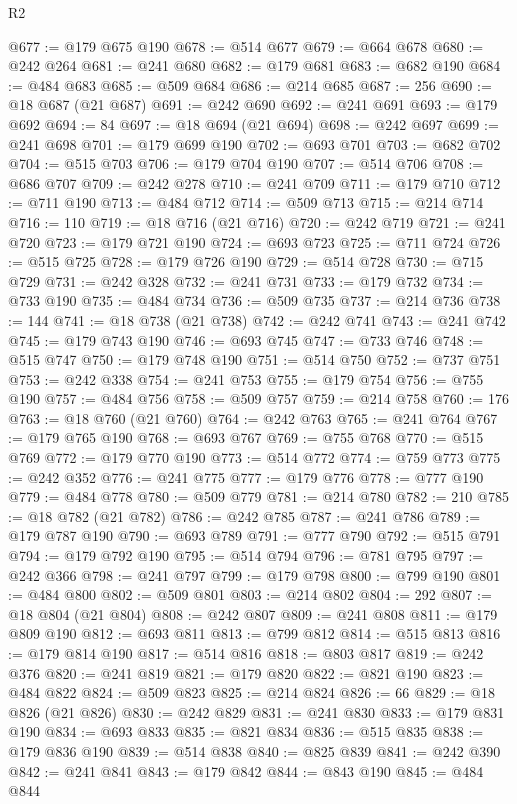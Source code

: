 \begin{lexlean}{R2}
\begin{coremodule}
@677 := @179 @675 @190
@678 := @514 @677
@679 := @664 @678
@680 := @242 @264
@681 := @241 @680
@682 := @179 @681
@683 := @682 @190
@684 := @484 @683
@685 := @509 @684
@686 := @214 @685
@687 := 256
@690 := @18 @687 (@21 @687)
@691 := @242 @690
@692 := @241 @691
@693 := @179 @692
@694 := 84
@697 := @18 @694 (@21 @694)
@698 := @242 @697
@699 := @241 @698
@701 := @179 @699 @190
@702 := @693 @701
@703 := @682 @702
@704 := @515 @703
@706 := @179 @704 @190
@707 := @514 @706
@708 := @686 @707
@709 := @242 @278
@710 := @241 @709
@711 := @179 @710
@712 := @711 @190
@713 := @484 @712
@714 := @509 @713
@715 := @214 @714
@716 := 110
@719 := @18 @716 (@21 @716)
@720 := @242 @719
@721 := @241 @720
@723 := @179 @721 @190
@724 := @693 @723
@725 := @711 @724
@726 := @515 @725
@728 := @179 @726 @190
@729 := @514 @728
@730 := @715 @729
@731 := @242 @328
@732 := @241 @731
@733 := @179 @732
@734 := @733 @190
@735 := @484 @734
@736 := @509 @735
@737 := @214 @736
@738 := 144
@741 := @18 @738 (@21 @738)
@742 := @242 @741
@743 := @241 @742
@745 := @179 @743 @190
@746 := @693 @745
@747 := @733 @746
@748 := @515 @747
@750 := @179 @748 @190
@751 := @514 @750
@752 := @737 @751
@753 := @242 @338
@754 := @241 @753
@755 := @179 @754
@756 := @755 @190
@757 := @484 @756
@758 := @509 @757
@759 := @214 @758
@760 := 176
@763 := @18 @760 (@21 @760)
@764 := @242 @763
@765 := @241 @764
@767 := @179 @765 @190
@768 := @693 @767
@769 := @755 @768
@770 := @515 @769
@772 := @179 @770 @190
@773 := @514 @772
@774 := @759 @773
@775 := @242 @352
@776 := @241 @775
@777 := @179 @776
@778 := @777 @190
@779 := @484 @778
@780 := @509 @779
@781 := @214 @780
@782 := 210
@785 := @18 @782 (@21 @782)
@786 := @242 @785
@787 := @241 @786
@789 := @179 @787 @190
@790 := @693 @789
@791 := @777 @790
@792 := @515 @791
@794 := @179 @792 @190
@795 := @514 @794
@796 := @781 @795
@797 := @242 @366
@798 := @241 @797
@799 := @179 @798
@800 := @799 @190
@801 := @484 @800
@802 := @509 @801
@803 := @214 @802
@804 := 292
@807 := @18 @804 (@21 @804)
@808 := @242 @807
@809 := @241 @808
@811 := @179 @809 @190
@812 := @693 @811
@813 := @799 @812
@814 := @515 @813
@816 := @179 @814 @190
@817 := @514 @816
@818 := @803 @817
@819 := @242 @376
@820 := @241 @819
@821 := @179 @820
@822 := @821 @190
@823 := @484 @822
@824 := @509 @823
@825 := @214 @824
@826 := 66
@829 := @18 @826 (@21 @826)
@830 := @242 @829
@831 := @241 @830
@833 := @179 @831 @190
@834 := @693 @833
@835 := @821 @834
@836 := @515 @835
@838 := @179 @836 @190
@839 := @514 @838
@840 := @825 @839
@841 := @242 @390
@842 := @241 @841
@843 := @179 @842
@844 := @843 @190
@845 := @484 @844

\end{coremodule}
\end{lexlean}
